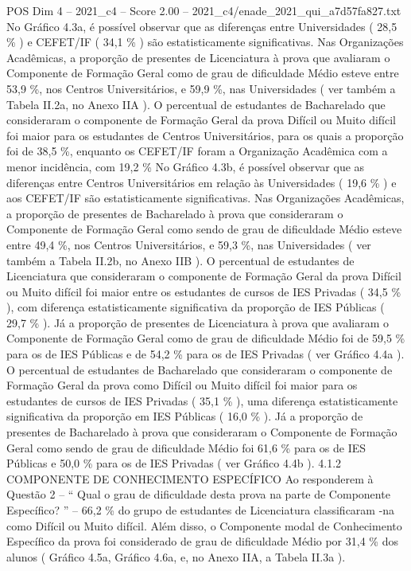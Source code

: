 \begin{textsample}{POS Dim 4 – 2021\_c4 – Score 2.00 – 2021\_c4/enade\_2021\_qui\_a7d57fa827.txt}
No Gráfico 4.3a, é possível observar que as diferenças entre Universidades ( 28,5 \% ) e CEFET/IF ( 34,1 \% ) são estatisticamente significativas.
Nas Organizações Acadêmicas, a proporção de presentes de Licenciatura à prova que avaliaram o Componente de Formação Geral como de grau de dificuldade Médio esteve entre 53,9 \%, nos Centros Universitários, e 59,9 \%, nas Universidades ( ver também a Tabela II.2a, no Anexo IIA ).
O percentual de estudantes de Bacharelado que consideraram o componente de Formação Geral da prova Difícil ou Muito difícil foi maior para os estudantes de Centros Universitários, para os quais a proporção foi de 38,5 \%, enquanto os CEFET/IF foram a Organização Acadêmica com a menor incidência, com 19,2 \% No Gráfico 4.3b, é possível observar que as diferenças entre Centros Universitários em relação às Universidades ( 19,6 \% ) e aos CEFET/IF são estatisticamente significativas.
Nas Organizações Acadêmicas, a proporção de presentes de Bacharelado à prova que consideraram o Componente de Formação Geral como sendo de grau de dificuldade Médio esteve entre 49,4 \%, nos Centros Universitários, e 59,3 \%, nas Universidades ( ver também a Tabela II.2b, no Anexo IIB ).
O percentual de estudantes de Licenciatura que consideraram o componente de Formação Geral da prova Difícil ou Muito difícil foi maior entre os estudantes de cursos de IES Privadas ( 34,5 \% ), com diferença estatisticamente significativa da proporção de IES Públicas ( 29,7 \% ).
Já a proporção de presentes de Licenciatura à prova que avaliaram o Componente de Formação Geral como de grau de dificuldade Médio foi de 59,5 \% para os de IES Públicas e de 54,2 \% para os de IES Privadas ( ver Gráfico 4.4a ).
O percentual de estudantes de Bacharelado que consideraram o componente de Formação Geral da prova como Difícil ou Muito difícil foi maior para os estudantes de cursos de IES Privadas ( 35,1 \% ), uma diferença estatisticamente significativa da proporção em IES Públicas ( 16,0 \% ).
Já a proporção de presentes de Bacharelado à prova que consideraram o Componente de Formação Geral como sendo de grau de dificuldade Médio foi 61,6 \% para os de IES Públicas e 50,0 \% para os de IES Privadas ( ver Gráfico 4.4b ). 4.1.2 COMPONENTE DE CONHECIMENTO ESPECÍFICO Ao responderem à Questão 2 – “ Qual o grau de dificuldade desta prova na parte de Componente Específico? ” – 66,2 \% do grupo de estudantes de Licenciatura classificaram -na como Difícil ou Muito difícil.
Além disso, o Componente modal de Conhecimento Específico da prova foi considerado de grau de dificuldade Médio por 31,4 \% dos alunos ( Gráfico 4.5a, Gráfico 4.6a, e, no Anexo IIA, a Tabela II.3a ).

\end{textsample}
